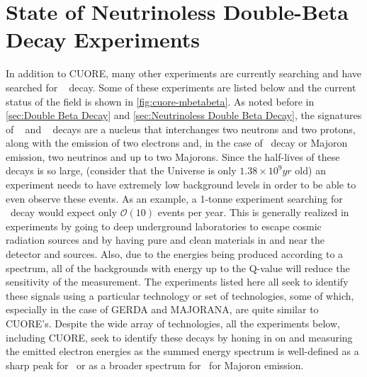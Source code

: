 \section{State of Neutrinoless Double-Beta Decay Experiments}
\label{sec:State of Neutrinoless Double Beta Decay Experiments}
In addition to CUORE, many other experiments are currently searching and have searched for \zeronubb~ decay. Some of these experiments are listed below and the current status of the field is shown in \autoref{fig:cuore-mbetabeta}. As noted before in \autoref{sec:Double Beta Decay} and \autoref{sec:Neutrinoless Double Beta Decay}, the signatures of \zeronubb~ and \twonubb~ decays are a nucleus that interchanges two neutrons and two protons, along with the emission of two electrons and, in the case of \twonubb~decay or Majoron emission, two neutrinos and up to two Majorons. Since the half-lives of these decays is so large, (consider that the Universe is only $1.38\times10^{9} yr$ old) an experiment needs to have extremely low background levels in order to be able to even observe these events. As an example, a 1-tonne experiment searching for \zeronubb~decay would expect only $\mathcal{O}(10)$ events per year.  This is generally realized in experiments by going to deep underground laboratories to escape cosmic radiation sources and by having pure and clean materials in and near the detector and sources. Also, due to the energies being produced according to a spectrum, all of the backgrounds with energy up to the Q-value will reduce the sensitivity of the measurement. The experiments listed here all seek to identify these signals using a particular technology or set of technologies, some of which, especially in the case of GERDA and MAJORANA, are quite similar to CUORE's. Despite the wide array of technologies, all the experiments below, including CUORE, seek to identify these decays by honing in on and measuring the emitted electron energies as the summed energy spectrum is well-defined as a sharp peak for \zeronubb~or as a broader spectrum for \twonubb~for Majoron emission.

